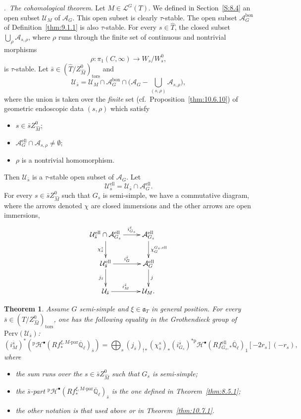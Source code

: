 \documentclass[12pt,a4paper,oneside,english,leqno]{smfart}
\makeatletter
\numberwithin{equation}{subsection}
\newcounter{theo}
\numberwithin{theo}{subsection}
\newenvironment{paragr}[1][]{\medskip\refstepcounter{subsection}%
  \par\noindent\hspace*{\parindent}\thesubsection.\ \emph{#1}%
  \@ifundefined{@empty}{}{}\ignorespaces}{\medskip}
\theoremstyle{plain}
\newtheorem{theorem}[theo]{Theorem}
\theoremstyle{definition}
\theoremstyle{remark}
\DeclareMathOperator{\el}{ell}
\DeclareMathOperator{\tors}{tors}
\newcommand{\Qlb}{\overline{\mathbb{Q}}_{\ell}}
\newcommand{\uc}{\mathcal{U}}
\newcommand{\lc}{\mathcal{L}}
\newcommand{\hc}{\mathcal{H}}
\newcommand{\Ac}{\mathcal{A}}
\newcommand{\Tc}{\widehat{T}}
\newcommand{\Mc}{\widehat{M}}
\newcommand{\ago}{\mathfrak{a}}
\makeatother
\begin{document}
\begin{paragr}[The cohomological theorem.]
Let $M\in\lc^G(T)$. We defined in Section~\ref{S:8.4} an open subset $\uc_M$ of $\Ac_G$. This open subset is clearly $\tau$-stable. The open subset $\Ac_G^{\mathrm{bon}}$ of Definition~\ref{thm:9.1.1} is also $\tau$-stable. For every $s\in\Tc$, the closed subset $\bigcup_\rho\Ac_{s,\rho}$, where $\rho$ runs through the finite set of continuous and nontrivial morphisms
$$\rho : \pi_1(C,\infty)\to W_s/W_s^0,$$
is $\tau$-stable. Let $\bar{s}\in(\Tc/Z_{\Mc}^0)_{\tors}$ and
\begin{equation}\label{eq:10.7.1}
\uc_{\bar{s}} = \uc_M\cap\Ac_G^{\mathrm{bon}}\cap\Big(\Ac_G-\bigcup_{(s,\rho)}\Ac_{s,\rho}\Big),
\end{equation}
where the union is taken over the \emph{finite} set (cf.\ Proposition~\ref{thm:10.6.10}) of geometric endoscopic data $(s,\rho)$ which satisfy
\begin{itemize}
\item[--] $s\in\bar{s}Z_{\Mc}^0$; \item[--] $\Ac_G^{\el}\cap\Ac_{s,\rho}\neq\emptyset$; \item[--] $\rho$ is a nontrivial homomorphism.
\end{itemize}
Then $\uc_{\bar{s}}$ is a $\tau$-stable open subset of $\Ac_G$. Let
$$\uc_{\bar{s}}^{\el} = \uc_{\bar{s}}\cap\Ac_G^{\el}.$$
For every $s\in\bar{s}Z_{\Mc}^0$ such that $G_s$ is semi-simple, we have a commutative diagram, where the arrows denoted $\chi$ are closed immersions and the other arrows are open immersions,
$$\xymatrix{
\uc_{\bar{s}}^{\el}\cap\Ac_{G_s}^{\el} \ar[r]^-{i_{G_s}^{\bar{s}}} \ar[d]_{\chi_{\bar{s}}^{s}} & \Ac_{G_s}^{\el} \ar[d]^{\chi_G^{G_s,\el}}\\
\uc_{\bar{s}}^{\el} \ar[r]^-{i_G^{\bar{s}}} \ar[d]_{j_{\bar{s}}} & \Ac_G^{\el} \ar[d]^{j}\\
\uc_{\bar{s}} \ar[r]^-{i_M^{\bar{s}}} & \uc_M.
}$$

\begin{theorem}\label{thm:10.7.3}
Assume $G$ semi-simple and $\xi\in\ago_T$ in general position. For every $\bar{s}\in(\Tc/Z_{\Mc}^0)_{\tors}$, one has the following equality in the Grothendieck group of $\mathrm{Perv}(\uc_{\bar{s}})$:
$$(i_M^{\bar{s}})^*({}^{\mathrm{p}}\hc^\bullet(Rf_*^{\xi,M\text{-par}}\Qlb)_{\bar{s}}) = \bigoplus_s (j_{\bar{s}})_{!*}(\chi_{\bar{s}}^s)_*(i_{G_s}^{\bar{s}})^{*\mathrm{p}}\hc^\bullet(Rf_{G_s,*}^{\el}\Qlb)_1[-2r_s](-r_s),$$
where
\begin{itemize}
\item[--] the sum runs over the $s\in\bar{s}Z_{\Mc}^0$ such that $G_s$ is semi-simple; \item[--] the $\bar{s}$-part ${}^{\mathrm{p}}\hc^\bullet(Rf_*^{\xi,M\text{-par}}\Qlb)_{\bar{s}}$ is the one defined in Theorem~\ref{thm:8.5.1}; \item[--] the other notation is that used above or in Theorem~\ref{thm:10.7.1}.
\end{itemize}
\end{theorem}


\end{paragr}
\end{document}
